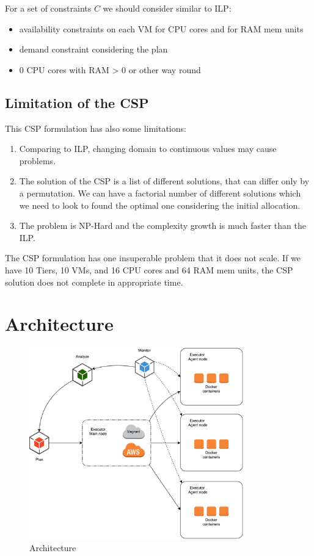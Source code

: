For a set of constraints $C$ we should consider similar to ILP:
\begin{itemize}
    \item availability constraints on each VM for CPU cores and for RAM mem units
    \item demand constraint considering the plan
    \item 0 CPU cores with RAM \textgreater{} 0 or other way round
\end{itemize}

\subsection{Limitation of the CSP}
This CSP formulation has also some limitations:
\begin{enumerate}
    \item Comparing to ILP, changing domain to continuous values may cause problems.
    \item The solution of the CSP is a list of different solutions, that can differ only by a permutation. We can have a factorial number of different solutions which we need to look to found the optimal one considering the initial allocation.
    \item The problem is NP-Hard and the complexity growth is much faster than the ILP.
\end{enumerate}

The CSP formulation has one insuperable problem that it does not scale. If we have 10 Tiers, 10 VMs, and 16 CPU cores and 64 RAM mem units, the CSP solution does not complete in appropriate time.

\section{Architecture}

\begin{figure}[ht]
  \centering
    \includegraphics[width=350px,natwidth=688,natheight=617]{./pictures/architecture}
    \caption{Architecture}
\end{figure}

